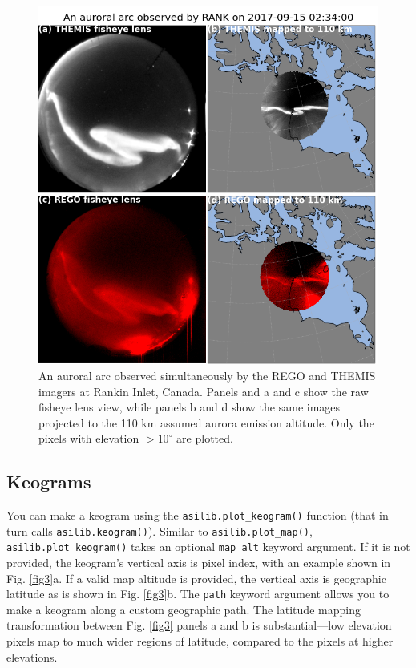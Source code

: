 \documentclass[utf8]{FrontiersinHarvard} %
\begin{document}
\begin{figure}
      \includegraphics[width=\textwidth]{figures/fig2.png}
      \caption{An auroral arc observed simultaneously by the REGO and THEMIS imagers at Rankin Inlet, Canada. Panels and a and c show the raw fisheye lens view, while panels b and d show the same images projected to the 110 km assumed aurora emission altitude. Only the pixels with elevation $>10^\circ$ are plotted.}
      \label{fig2}
\end{figure}

\subsection{Keograms}
You can make a keogram using the \verb|asilib.plot_keogram()| function (that in turn calls \verb|asilib.keogram()|). Similar to \verb|asilib.plot_map()|, \verb|asilib.plot_keogram()| takes an optional \verb|map_alt| keyword argument. If it is not provided, the keogram's vertical axis is pixel index, with an example shown in Fig. \ref{fig3}a. If a valid map altitude is provided, the vertical axis is geographic latitude as is shown in Fig. \ref{fig3}b. The \verb|path| keyword argument allows you to make a keogram along a custom geographic path. The latitude  mapping transformation between Fig. \ref{fig3} panels a and b is substantial---low elevation pixels map to much wider regions of latitude, compared to the pixels at higher elevations.
\end{document}
